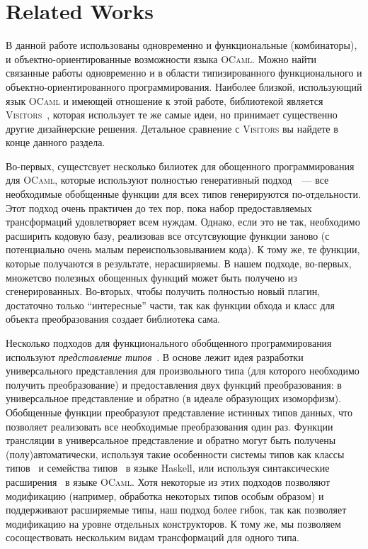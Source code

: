 \section{Related Works}
\label{sec:relatedworks}

В данной работе использованы одновременно и функциональные (комбинаторы), и объектно-ориентированные возможности языка \textsc{OCaml}. Можно найти связанные работы  одновременно и в области типизированного функционального и объектно-ориентированного программирования. Наиболее близкой, использующий язык \textsc{OCaml} и имеющей отношение к этой работе, библиотекой является \textsc{Visitors}~\cite{Visitors}, которая использует те же самые идеи, но принимает существенно другие дизайнерские решения. Детальное сравнение с \textsc{Visitors} вы найдете в конце данного раздела.

Во-первых, сущестсвует несколько билиотек для обощенного программирования для \textsc{OCaml}, которые используют полностью генеративный подход~\cite{Yallop,PPXLib}~--- все необходимые обобщенные функции для всех типов генерируются по-отдельности. Этот подход очень практичен до тех пор, пока набор предоставляемых трансформаций удовлетворяет всем нуждам. Однако, если это не так, необходимо расширить кодовую базу, реализовав все отсутсвующие функции заново
(с потенциально очень малым переиспользовыванием кода). К тому же, те функции,
которые получаются в результате, нерасширяемы. В нашем подходе, во-первых,
множетсво полезных обощенных функций может быть получено из сгенерированных. Во-вторых, чтобы получить полностью новый плагин, достаточно только ``интересные'' части, так как функции обхода и класс для объекта преобразования создает библиотека сама.

Несколько подходов для функционального обобщенного программирования используют 
\emph{представление типов}~\cite{Hinze}. В основе лежит идея разработки универсального представления для произвольного типа (для которого необходимо получить преобразование) и предоставления двух функций преобразования: в универсальное представление и обратно (в идеале образующих изоморфизм). Обобщенные функции преобразуют представление истинных типов данных, что позволяет реализовать все необходимые преобразования один раз. Функции трансляции в универсальное представление и обратно могут быть получены (полу)автоматически, используя такие особенности системы типов  как классы типов~\cite{Hinze,ALaCarte} и семейства типов~\cite{InstantGenerics} в языке Haskell, или  используя синтаксические расширения~\cite{GenericOCaml} в языке \textsc{OCaml}. Хотя некоторые из этих подходов позволяют модификацию (например, обработка некоторых типов особым образом) и поддерживают расширяемые типы, наш подход более гибок, так как позволяет модификацию на уровне отдельных конструкторов. К тому же, мы позволяем сосоществовать нескольким видам трансформаций для одного типа.

